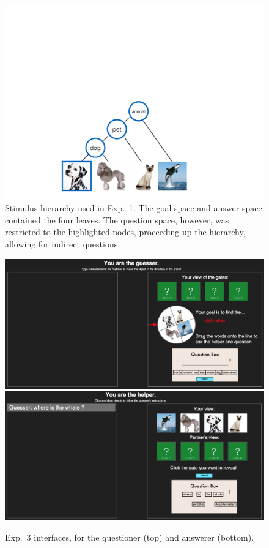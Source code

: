 \documentclass[12pt, floatsintext, jou]{apa6}
\begin{document}
%
\begin{figure}[t!]
\begin{center}
\includegraphics[scale = .35]{taskhierarchy.pdf}
\end{center}
\vspace{-.25cm}
\caption{Stimulus hierarchy used in Exp.~1. The goal space and answer space contained the four leaves. %
The question space, however, was restricted to the highlighted nodes, proceeding up the hierarchy, allowing for indirect questions.}
\label{fig:taskhierarchy}
\end{figure}
	\begin{figure}[t!]
\begin{center}
\includegraphics[scale = .3]{Exp3GuesserView}
\includegraphics[scale = .3]{Exp3HelperView}
\end{center}
\caption{Exp.~3 interfaces, for the questioner (top) and answerer (bottom).}
\label{fig:exp3views}
\end{figure}
\end{document}
